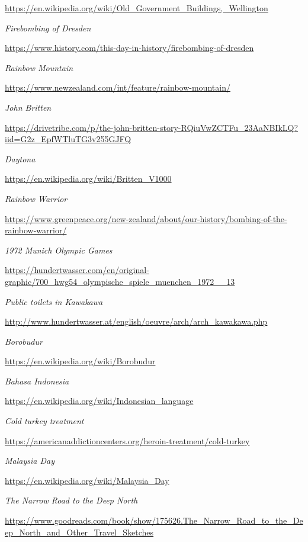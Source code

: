 \begin{thebibliography}{9}
  {\urlsize \url{https://en.wikipedia.org/wiki/Old_Government_Buildings,_Wellington}}

 \emph{Firebombing of Dresden}

  {\urlsize \url{https://www.history.com/this-day-in-history/firebombing-of-dresden}}

 \emph{Rainbow Mountain}

  {\urlsize \url{https://www.newzealand.com/int/feature/rainbow-mountain/}}

 \emph{John Britten}

  {\urlsize \url{https://drivetribe.com/p/the-john-britten-story-RQiuVwZCTFu_23AaNBIkLQ?iid=G2z_EpfWTluTG3v255GJFQ}}

 \emph{Daytona}

  {\urlsize \url{https://en.wikipedia.org/wiki/Britten_V1000}}

 \emph{Rainbow Warrior}

  {\urlsize \url{https://www.greenpeace.org/new-zealand/about/our-history/bombing-of-the-rainbow-warrior/}}

 \emph{1972 Munich Olympic Games}

  {\urlsize \url{https://hundertwasser.com/en/original-graphic/700_hwg54_olympische_spiele_muenchen_1972__13}}

 \emph{Public toilets in Kawakawa}

  {\urlsize \url{http://www.hundertwasser.at/english/oeuvre/arch/arch_kawakawa.php}}

 \emph{Borobudur}

  {\urlsize \url{https://en.wikipedia.org/wiki/Borobudur}}

 \emph{Bahasa Indonesia}

  {\urlsize \url{https://en.wikipedia.org/wiki/Indonesian_language}}

 \emph{Cold turkey treatment}

  {\urlsize \url{https://americanaddictioncenters.org/heroin-treatment/cold-turkey}}

 \emph{Malaysia Day}

  {\urlsize \url{https://en.wikipedia.org/wiki/Malaysia_Day}}

 \emph{The Narrow Road to the Deep North}

  {\urlsize \url{https://www.goodreads.com/book/show/175626.The_Narrow_Road_to_the_Deep_North_and_Other_Travel_Sketches}}


\end{thebibliography}
